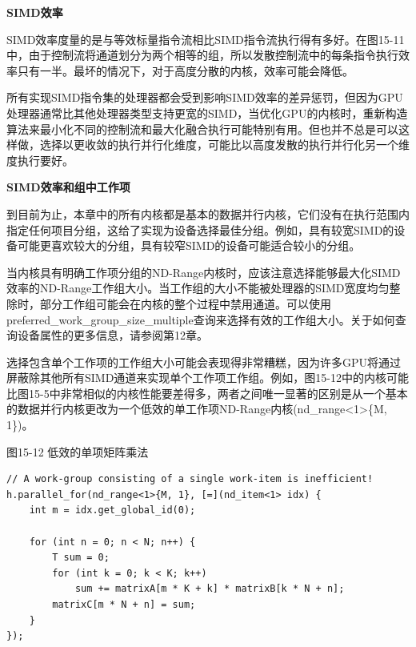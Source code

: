 \hspace*{\fill} \par %
\textbf{SIMD效率}

SIMD效率度量的是与等效标量指令流相比SIMD指令流执行得有多好。在图15-11中，由于控制流将通道划分为两个相等的组，所以发散控制流中的每条指令执行效率只有一半。最坏的情况下，对于高度分散的内核，效率可能会降低。\par

所有实现SIMD指令集的处理器都会受到影响SIMD效率的差异惩罚，但因为GPU处理器通常比其他处理器类型支持更宽的SIMD，当优化GPU的内核时，重新构造算法来最小化不同的控制流和最大化融合执行可能特别有用。但也并不总是可以这样做，选择以更收敛的执行并行化维度，可能比以高度发散的执行并行化另一个维度执行要好。\par

\hspace*{\fill} \par %
\textbf{SIMD效率和组中工作项}

到目前为止，本章中的所有内核都是基本的数据并行内核，它们没有在执行范围内指定任何项目分组，这给了实现为设备选择最佳分组。例如，具有较宽SIMD的设备可能更喜欢较大的分组，具有较窄SIMD的设备可能适合较小的分组。\par

当内核具有明确工作项分组的ND-Range内核时，应该注意选择能够最大化SIMD效率的ND-Range工作组大小。当工作组的大小不能被处理器的SIMD宽度均匀整除时，部分工作组可能会在内核的整个过程中禁用通道。可以使用preferred\_work\_group\_size\_multiple查询来选择有效的工作组大小。关于如何查询设备属性的更多信息，请参阅第12章。\par

选择包含单个工作项的工作组大小可能会表现得非常糟糕，因为许多GPU将通过屏蔽除其他所有SIMD通道来实现单个工作项工作组。例如，图15-12中的内核可能比图15-5中非常相似的内核性能要差得多，两者之间唯一显著的区别是从一个基本的数据并行内核更改为一个低效的单工作项ND-Range内核(nd\_range<1>\{M, 1\})。\par

\hspace*{\fill} \par %
图15-12 低效的单项矩阵乘法
\begin{lstlisting}[caption={}]
// A work-group consisting of a single work-item is inefficient!
h.parallel_for(nd_range<1>{M, 1}, [=](nd_item<1> idx) {
	int m = idx.get_global_id(0);
	
	for (int n = 0; n < N; n++) {
		T sum = 0;
		for (int k = 0; k < K; k++)
			sum += matrixA[m * K + k] * matrixB[k * N + n];
		matrixC[m * N + n] = sum;
	}
});
\end{lstlisting}

